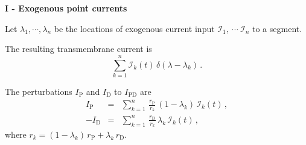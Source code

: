 \documentclass{slides}
\def\ds{\displaystyle}
\begin{document}
%
%
\begin{slide}
\begin{center}
\textbf{I - Exogenous point currents}
\end{center}
Let $\lambda_1,\cdots,\lambda_n$ be the locations of
exogenous current input $\mathcal{I}_1,\ \cdots\
\mathcal{I}_n$ to a segment.

The resulting transmembrane current is
\[
\sum_{k=1}^n \mathcal{I}_k(t)\,\delta(\lambda-\lambda_k)\,.
\]

The perturbations $I_\mathrm{P}$ and $I_\mathrm{D}$ to
$I_\mathrm{PD}$ are
\[
\begin{array}{rcl}
I_\mathrm{P} & = &\ds \sum_{k=1}^n\,
\frac{r_\mathrm{P}}{r_k}\,(1-\lambda_k)\,\mathcal{I}_k(t)\,,\\[25pt]
-I_\mathrm{D} & = &\ds \sum_{k=1}^n\,
\frac{r_\mathrm{D}}{r_k}\,\lambda_k\,\mathcal{I}_k(t)\,,
\end{array}
\]
where $r_k=(1-\lambda_k)\,r_\mathrm{P} +\lambda_k\,r_\mathrm{D}$.
\end{slide}
\end{document}
